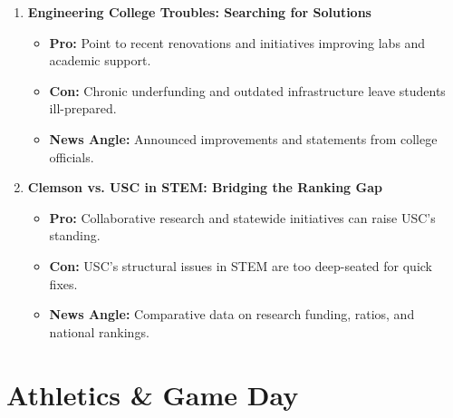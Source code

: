 \documentclass{article}
\begin{document}
\begin{enumerate}[leftmargin=*]
    \item \textbf{Engineering College Troubles: Searching for Solutions}
    \begin{itemize}
        \item \textbf{Pro:} Point to recent renovations and initiatives improving labs and academic support.
        \item \textbf{Con:} Chronic underfunding and outdated infrastructure leave students ill-prepared.
        \item \textbf{News Angle:} Announced improvements and statements from college officials.
    \end{itemize}

    \item \textbf{Clemson vs. USC in STEM: Bridging the Ranking Gap}
    \begin{itemize}
        \item \textbf{Pro:} Collaborative research and statewide initiatives can raise USC's standing.
        \item \textbf{Con:} USC's structural issues in STEM are too deep-seated for quick fixes.
        \item \textbf{News Angle:} Comparative data on research funding, ratios, and national rankings.
    \end{itemize}
\end{enumerate}

\section*{Athletics \& Game Day}
\end{document}
